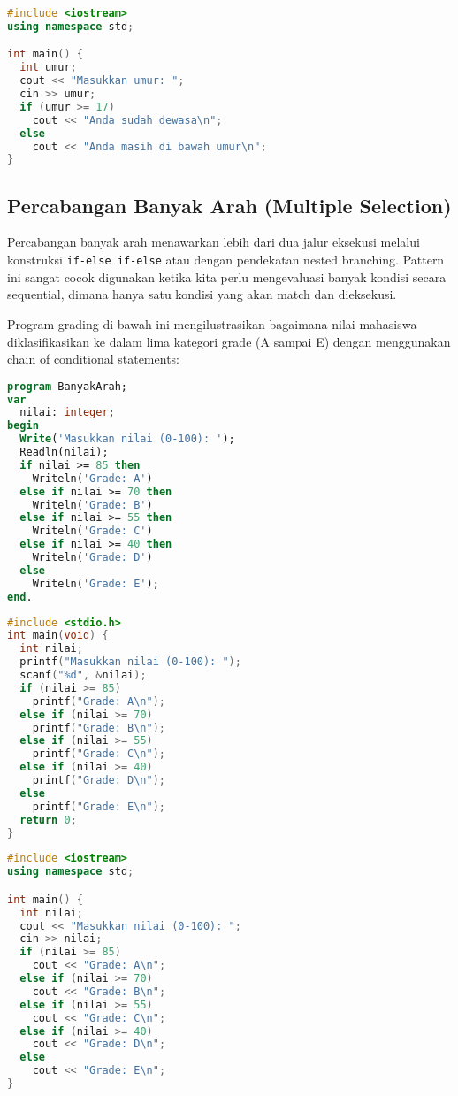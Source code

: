 \documentclass[../main.tex]{subfiles}
\begin{document}
\begin{lstlisting}[language=C++, caption={Percabangan dua arah di C++}]
#include <iostream>
using namespace std;

int main() {
  int umur;
  cout << "Masukkan umur: ";
  cin >> umur;
  if (umur >= 17)
    cout << "Anda sudah dewasa\n";
  else
    cout << "Anda masih di bawah umur\n";
}
\end{lstlisting}

\subsection{Percabangan Banyak Arah (Multiple Selection)}
Percabangan banyak arah menawarkan lebih dari dua jalur eksekusi melalui konstruksi \texttt{if-else if-else} atau dengan pendekatan nested branching. Pattern ini sangat cocok digunakan ketika kita perlu mengevaluasi banyak kondisi secara sequential, dimana hanya satu kondisi yang akan match dan dieksekusi.

Program grading di bawah ini mengilustrasikan bagaimana nilai mahasiswa diklasifikasikan ke dalam lima kategori grade (A sampai E) dengan menggunakan chain of conditional statements:

\begin{lstlisting}[language=Pascal, caption={Percabangan banyak arah di Pascal}]
program BanyakArah;
var
  nilai: integer;
begin
  Write('Masukkan nilai (0-100): ');
  Readln(nilai);
  if nilai >= 85 then
    Writeln('Grade: A')
  else if nilai >= 70 then
    Writeln('Grade: B')
  else if nilai >= 55 then
    Writeln('Grade: C')
  else if nilai >= 40 then
    Writeln('Grade: D')
  else
    Writeln('Grade: E');
end.
\end{lstlisting}

\begin{lstlisting}[language=C, caption={Percabangan banyak arah di C}]
#include <stdio.h>
int main(void) {
  int nilai;
  printf("Masukkan nilai (0-100): ");
  scanf("%d", &nilai);
  if (nilai >= 85)
    printf("Grade: A\n");
  else if (nilai >= 70)
    printf("Grade: B\n");
  else if (nilai >= 55)
    printf("Grade: C\n");
  else if (nilai >= 40)
    printf("Grade: D\n");
  else
    printf("Grade: E\n");
  return 0;
}
\end{lstlisting}

\begin{lstlisting}[language=C++, caption={Percabangan banyak arah di C++}]
#include <iostream>
using namespace std;

int main() {
  int nilai;
  cout << "Masukkan nilai (0-100): ";
  cin >> nilai;
  if (nilai >= 85)
    cout << "Grade: A\n";
  else if (nilai >= 70)
    cout << "Grade: B\n";
  else if (nilai >= 55)
    cout << "Grade: C\n";
  else if (nilai >= 40)
    cout << "Grade: D\n";
  else
    cout << "Grade: E\n";
}
\end{lstlisting}
\end{document}
